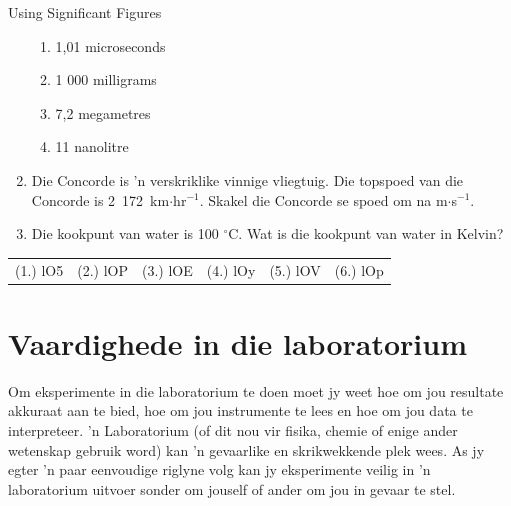 \begin{exercises}{Using Significant Figures }
\begin{enumerate}[noitemsep, label=\textbf{\arabic*}. ]
\begin{enumerate}[noitemsep, label=\textbf{\alph*}. ]
  \item 1,01 microseconds
  \item 1 000 milligrams
  \item 7,2 megametres
  \item 11 nanolitre
  \end{enumerate}
  \item Die Concorde is  'n verskriklike vinnige vliegtuig. Die topspoed van die Concorde is 2~172~km$\ensuremath{\cdot}$hr${}^{-1}$. Skakel die Concorde se spoed om na m$\ensuremath{\cdot}$s${}^{-1}$.        
  \item Die kookpunt van water is 100 ${}^{\circ }$C. Wat is die kookpunt van water in Kelvin? 
\end{enumerate}
\par \practiceinfo
 \par \begin{tabular}[h]{cccccc}
  (1.) lO5  &  (2.) lOP  &  (3.) lOE  &  (4.) lOy  &  (5.) lOV  &  (6.) lOp \end{tabular}
\end{exercises}

\section{Vaardighede in die laboratorium}
Om eksperimente in die laboratorium te doen moet jy weet hoe om jou resultate akkuraat aan te bied, hoe om jou instrumente te lees en hoe om jou data te interpreteer.  'n Laboratorium (of dit nou vir fisika, chemie of enige ander wetenskap gebruik word) kan  'n gevaarlike en skrikwekkende plek wees. As jy egter  'n paar eenvoudige riglyne volg kan jy eksperimente veilig in  'n laboratorium uitvoer sonder om jouself of ander om jou in gevaar te stel.
